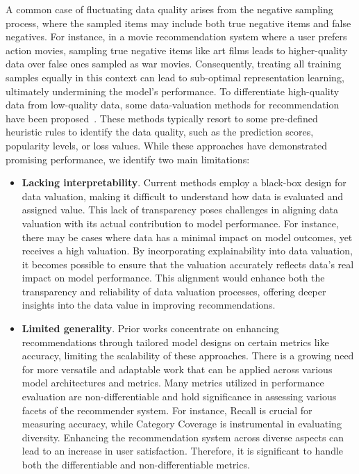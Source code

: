 A common case of fluctuating data quality arises from the negative sampling process, where the sampled items may include both true negative items and false negatives. For instance, in a movie recommendation system where a user prefers action movies, sampling true negative items like art films leads to higher-quality data over false ones sampled as war movies. Consequently, treating all training samples equally in this context can lead to sub-optimal representation learning, ultimately undermining the model's performance.
To differentiate high-quality data from low-quality data, some data-valuation methods for recommendation have been proposed~\cite{10.1145/3437963.3441800, 10.1145/2556195.2556248,gantner2012personalized,10.1145/3366423.3380187, wu2022adapting}. These methods typically resort to some pre-defined heuristic rules to identify the data quality, such as the prediction scores, popularity levels, or loss values. While these approaches have demonstrated promising performance, we identify two main limitations:
\begin{itemize}
    \item \textbf{Lacking interpretability}. Current methods employ a black-box design for data valuation, making it difficult to understand how data is evaluated and assigned value. This lack of transparency poses challenges in aligning data valuation with its actual contribution to model performance. For instance, there may be cases where data has a minimal impact on model outcomes, yet receives a high valuation. By incorporating explainability into data valuation, it becomes possible to ensure that the valuation accurately reflects data's real impact on model performance. This alignment would enhance both the transparency and reliability of data valuation processes, offering deeper insights into the data value in improving recommendations. 
    \item \textbf{Limited generality}. Prior works concentrate on enhancing recommendations through tailored model designs on certain metrics like accuracy, limiting the scalability of these approaches. There is a growing need for more versatile and adaptable work that can be applied across various model architectures and metrics. Many metrics utilized in performance evaluation are non-differentiable and hold significance in assessing various facets of the recommender system. For instance, Recall is crucial for measuring accuracy, while Category Coverage is instrumental in evaluating diversity. Enhancing the recommendation system across diverse aspects can lead to an increase in user satisfaction. Therefore, it is significant to handle both the differentiable and non-differentiable metrics.
\end{itemize}

